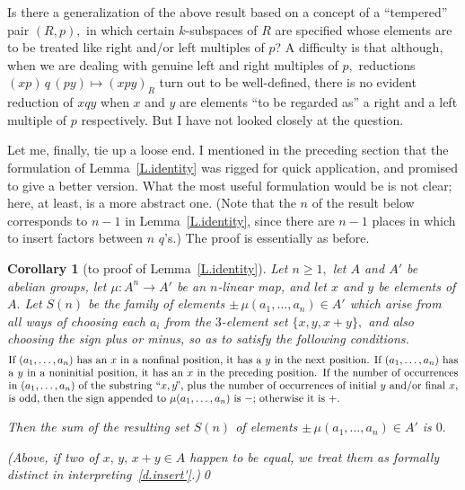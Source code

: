 \documentclass{amsart}
\newtheorem{corollary}[theorem]{Corollary}
\begin{document}
Is there a generalization of the above result based on a concept of
a ``tempered'' pair $(R,p),$ in which certain $\!k\!$-subspaces of $R$
are specified whose elements are to be treated like
right and/or left multiples of $p$?
A difficulty is that although, when we are dealing with genuine
left and right multiples of $p,$ reductions
$(xp)\,q\,(py)\mapsto (xpy)_R$ turn out to be well-defined, there is
no evident reduction of $xqy$ when $x$ and $y$ are
elements ``to be regarded as'' a right and a left multiple of $p$
respectively.
But I have not looked closely at the question.
\vspace{.3em}

Let me, finally, tie up a loose end.
I mentioned in the preceding section that the formulation of
Lemma~\ref{L.identity} was rigged for quick application,
and promised to give a better version.
What the most useful formulation would
be is not clear; here, at least, is a more abstract one.
(Note that the $n$ of the result below corresponds
to $n{-}1$ in Lemma~\ref{L.identity}, since there are $n{-}1$
places in which to insert factors between $n$ $q$'s.)
The proof is essentially as before.

\begin{corollary}[to proof of Lemma~\ref{L.identity}]\label{C.multilin}
Let $n\geq 1,$ let $A$ and $A'$ be abelian groups,
let $\mu: A^n\to A'$ be an $\!n\!$-linear map,
and let $x$ and $y$ be elements of $A.$
Let $S(n)$ be the family of elements $\pm\,\mu(a_1,\dots,a_n)\in A'$
which arise from all ways of choosing each $a_i$ from the
$\!3\!$-element set $\{x,y,x{+}y\},$ and also choosing the
sign plus or minus, so as to satisfy the following conditions.
\begin{equation}\begin{minipage}[c]{35pc}\label{d.insert'}
If $(a_1,\dots,a_n)$ has an $x$ in a nonfinal position, it
has a $y$ in the next position.

If $(a_1,\dots,a_n)$ has a $y$ in a noninitial position, it
has an $x$ in the preceding position.

If the number of occurrences in $(a_1,\dots,a_n)$
of the substring ``$x,y\!$'', plus the
number of occurrences of initial $y$ and/or final $x,$
is odd, then the sign appended
to $\mu(a_1,\dots,a_n)$ is $-;$ otherwise it is $+.$
\end{minipage}\end{equation}

Then the sum of the resulting set $S(n)$ of elements
$\pm\,\mu(a_1,\dots,a_n)\in A'$ is $0.$

\textup{(}Above, if two of $x,\,y,\,x{+}y\in A$
happen to be equal, we treat them as formally distinct
in interpreting~\eqref{d.insert'}.\textup{)}\qed
\end{corollary}
\end{document}
